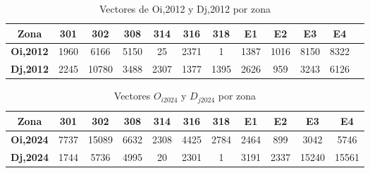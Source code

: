 \documentclass[letterpaper,12pt]{article}
\begin{document}
\begin{table}[h!]
    \centering
    \begin{tabular}{c|ccccccccccc}
    \textbf{Zona} & \textbf{301} & \textbf{302} & \textbf{308} & \textbf{314} & \textbf{316} & \textbf{318} & \textbf{E1} & \textbf{E2} & \textbf{E3} & \textbf{E4} \\ \hline
    \textbf{Oi,2012} & 1960 & 6166 & 5150 & 25 & 2371 & 1 & 1387 & 1016 & 8150 & 8322 \\ 
    \textbf{Dj,2012} & 2245 & 10780 & 3488 & 2307 & 1377 & 1395 & 2626 & 959 & 3243 & 6126 \\
    \end{tabular}
    \caption{Vectores de Oi,2012 y Dj,2012 por zona}
    \label{table:oi_dj_2012}
    \end{table}
    
    
\begin{table}[h!]
    \centering
    \begin{tabular}{c|cccccccccc}
    \textbf{Zona} & \textbf{301} & \textbf{302} & \textbf{308} & \textbf{314} & \textbf{316} & \textbf{318} & \textbf{E1} & \textbf{E2} & \textbf{E3} & \textbf{E4} \\ \hline
    \textbf{Oi,2024} & 7737 & 15089 & 6632 & 2308 & 4425 & 2784 & 2464 & 899 & 3042 & 5746 \\ 
    \textbf{Dj,2024} & 1744 & 5736 & 4995 & 20 & 2301 & 1 & 3191 & 2337 & 15240 & 15561 \\ 
    \end{tabular}
    \caption{Vectores $O_{i2024}$ y $D_{j2024}$ por zona}
    \label{table:oi_dj_2024}
\end{table}
\end{document}
